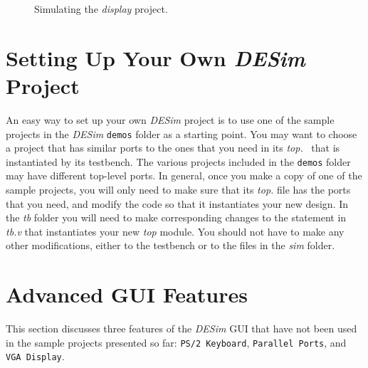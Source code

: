 {\begin{figure}[t]
\begin{center}
        \fi
	\end{center}
          \caption{Simulating the {\it display} project.}
	\label{fig:sim3}
\end{figure}

\section{Setting Up Your Own {\it DESim} Project}

An easy way to set up your own {\it DESim} project is to use one of the sample projects in
the {\it DESim} \texttt{demos} folder as a starting point. You may want to choose 
a project that has similar ports to the ones that you need in its {\it top.\hdlFileExt }
\hdlModuleName~that is instantiated by its testbench. The various projects included in 
the \texttt{demos} folder may have different top-level ports. In general, once you make a
copy of one of the sample projects, you will only need to make sure that its
{\it top.\hdlFileExt } file has the ports that you need, and modify the code so that it
instantiates your new design. In the {\it tb} folder you will need 
to make corresponding changes to the statement in {\it tb.v } that instantiates your 
new {\it top} module.  You should not have to make any other modifications, either to the
testbench or to the files in the {\it sim} folder. 

\section{Advanced GUI Features}
\label{sec:advanced}
This section discusses three features of the {\it DESim} GUI that have not been used in the 
sample projects presented so far: \texttt{PS/2 Keyboard}, \texttt{Parallel Ports}, and 
\texttt{VGA Display}.

}

